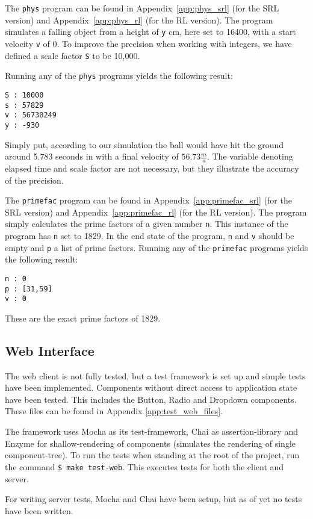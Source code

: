 The \texttt{phys} program can be found in Appendix~\ref{app:phys_srl} (for the SRL version) and Appendix~\ref{app:phys_rl} (for the RL version).
The program simulates a falling object from a height of \texttt{y} cm, here set to 16400, with a start velocity \texttt{v} of 0. To improve the precision when working with integers, we have defined a scale factor \texttt{S} to be 10,000.

Running any of the \texttt{phys} programs yields the following result:
\begin{verbatim}
S : 10000
s : 57829
v : 56730249
y : -930
\end{verbatim}
Simply put, according to our simulation the ball would have hit the ground around 5.783 seconds in with a final velocity of $56.73 \frac{m}{s}$. The variable denoting elapsed time and scale factor are not necessary, but they illustrate the accuracy of the precision.


The \texttt{primefac} program can be found in Appendix~\ref{app:primefac_srl} (for the SRL version) and Appendix~\ref{app:primefac_rl} (for the RL version). The program simply calculates the prime factors of a given number \texttt{n}. This instance of the program has \texttt{n} set to 1829. In the end state of the program, \texttt{n} and \texttt{v} should be empty and \texttt{p} a list of prime factors. Running any of the \texttt{primefac} programs yields the following result:
\begin{verbatim}
n : 0
p : [31,59]
v : 0
\end{verbatim}
These are the exact prime factors of 1829.

\subsection{Web Interface}

The web client is not fully tested, but a test framework is set up and simple tests have been implemented. Components without direct access to application state have been tested. This includes the Button, Radio and Dropdown components.
These files can be found in Appendix \ref{app:test_web_files}.

The framework uses Mocha as its test-framework, Chai as assertion-library and Enzyme for shallow-rendering of components (simulates the rendering of single component-tree).
To run the tests when standing at the root of the project, run the command \texttt{\$ make test-web}.
This executes tests for both the client and server.

For writing server tests, Mocha and Chai have been setup, but as of yet no tests have been written.

